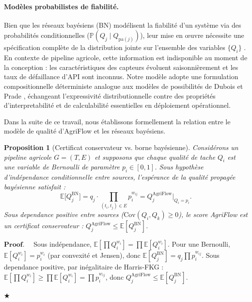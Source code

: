\documentclass[12pt]{article}
\newtheorem{proposition}{Proposition}[section]
\newenvironment{proof}{$\mathbf{Proof.\quad}$}{\begin{flushright}$\bigstar$\end{flushright}}
\newcommand{\E}{\mathbb{E}}
\begin{document}
\paragraph{Modèles probabilistes de fiabilité.}
Bien que les réseaux bayésiens (BN) modélisent la fiabilité d'un système via des probabilités conditionnelles ($\mathbb{P}(Q_j \mid Q_{\text{pa}(j)})$), leur mise en \oe uvre  nécessite une spécification complète de la distribution jointe sur l’ensemble des variables $\{Q_i\}$ \cite{bayesian_reliability}.
En contexte de pipeline agricole, cette information est indisponible au moment de la conception : les caractéristiques des capteurs évoluent
saisonnièrement et les taux de défaillance d'API sont inconnus.
Notre modèle adopte une formulation compositionnelle déterministe
analogue aux modèles de possibilités de Dubois et Prade
\cite{possibility_theory}, échangeant l’expressivité distributionnelle
contre des propriétés d'interpretabilité et de calculabilité essentielles
en déploiement opérationnel.

Dans la suite de ce travail, nous établissons formellement la relation entre le modèle de qualité
d'AgriFlow et les réseaux bayésiens.

\begin{proposition}[Certificat conservateur vs. borne bayésienne]
	\label{prop:bayes_bound}
Considérons 	un pipeline agricole $ G=(T,E)$ et supposons que chaque qualité de
	tache $Q_i$ est une variable de Bernoulli de paramètre $p_i \in [0,1]$.
	Sous hypothèse d’indépendance conditionnelle entre sources,
	l’espérance de la qualité propagée bayésienne satisfait :
	\begin{equation}
		\E\bigl[Q_j^{\mathrm{BN}}\bigr]
		= q_j \cdot \prod_{(t_i,t_j)\in E} p_i^{w_{ij}}
		= Q_j^{\mathrm{AgriFlow}}\big|_{Q_i = p_i}.
		\label{eq:bayes_equiv}
	\end{equation}
	Sous dependance positive entre sources ($\text{Cov}(Q_i,Q_k) \geq 0$),
	le score AgriFlow est un certificat conservateur :
	$Q_j^{\mathrm{AgriFlow}} \leq \E[Q_j^{\mathrm{BN}}]$.
\end{proposition}

\begin{proof}
	Sous indépendance, $\E[\prod Q_i^{w_i}] = \prod \E[Q_i^{w_i}]$.
	Pour une Bernoulli, $\E[Q_i^{w_i}] = p_i^{w_i}$ (par convexité et
	Jensen), donc $\E[Q_j^{\mathrm{BN}}] = q_j \prod p_i^{w_{ij}}$.
	Sous dependance positive, par inégalitaire de Harris-FKG
	\cite{fkg_inequality} : $\E[\prod Q_i^{w_i}] \geq \prod \E[Q_i^{w_i}]
	= \prod p_i^{w_{ij}}$, donc $Q_j^{\mathrm{AgriFlow}} \leq
	\E[Q_j^{\mathrm{BN}}]$.
\end{proof}
\end{document}
